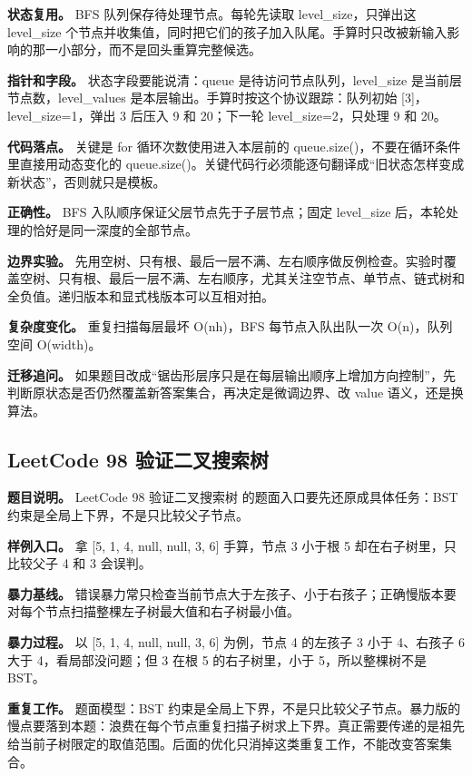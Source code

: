 \textbf{状态复用。} BFS 队列保存待处理节点。每轮先读取 level\_size，只弹出这 level\_size 个节点并收集值，同时把它们的孩子加入队尾。手算时只改被新输入影响的那一小部分，而不是回头重算完整候选。

\textbf{指针和字段。} 状态字段要能说清：queue 是待访问节点队列，level\_size 是当前层节点数，level\_values 是本层输出。手算时按这个协议跟踪：队列初始 [3]，level\_size=1，弹出 3 后压入 9 和 20；下一轮 level\_size=2，只处理 9 和 20。

\textbf{代码落点。} 关键是 for 循环次数使用进入本层前的 queue.size()，不要在循环条件里直接用动态变化的 queue.size()。关键代码行必须能逐句翻译成“旧状态怎样变成新状态”，否则就只是模板。

\textbf{正确性。} BFS 入队顺序保证父层节点先于子层节点；固定 level\_size 后，本轮处理的恰好是同一深度的全部节点。

\textbf{边界实验。} 先用空树、只有根、最后一层不满、左右顺序做反例检查。实验时覆盖空树、只有根、最后一层不满、左右顺序，尤其关注空节点、单节点、链式树和全负值。递归版本和显式栈版本可以互相对拍。

\textbf{复杂度变化。} 重复扫描每层最坏 O(nh)，BFS 每节点入队出队一次 O(n)，队列空间 O(width)。

\textbf{迁移追问。} 如果题目改成“锯齿形层序只是在每层输出顺序上增加方向控制”，先判断原状态是否仍然覆盖新答案集合，再决定是微调边界、改 value 语义，还是换算法。

\subsection{LeetCode 98 验证二叉搜索树}

\textbf{题目说明。} LeetCode 98 验证二叉搜索树 的题面入口要先还原成具体任务：BST 约束是全局上下界，不是只比较父子节点。

\textbf{样例入口。} 拿 [5, 1, 4, null, null, 3, 6] 手算，节点 3 小于根 5 却在右子树里，只比较父子 4 和 3 会误判。

\textbf{暴力基线。} 错误暴力常只检查当前节点大于左孩子、小于右孩子；正确慢版本要对每个节点扫描整棵左子树最大值和右子树最小值。

\textbf{暴力过程。} 以 [5, 1, 4, null, null, 3, 6] 为例，节点 4 的左孩子 3 小于 4、右孩子 6 大于 4，看局部没问题；但 3 在根 5 的右子树里，小于 5，所以整棵树不是 BST。

\textbf{重复工作。} 题面模型：BST 约束是全局上下界，不是只比较父子节点。暴力版的慢点要落到本题：浪费在每个节点重复扫描子树求上下界。真正需要传递的是祖先给当前子树限定的取值范围。后面的优化只消掉这类重复工作，不能改变答案集合。

